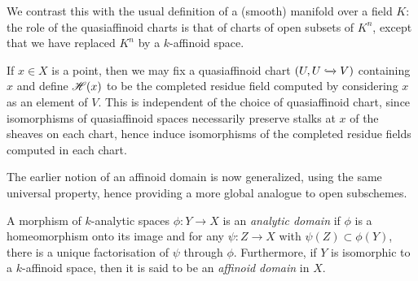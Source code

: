 We contrast this with the usual definition of a (smooth) manifold over a field $K$: the role of the quasiaffinoid charts is that of charts of open subsets of $K^n$, except that we have replaced $K^n$ by a $k$-affinoid space.

If $x \in X$ is a point, then we may fix a quasiaffinoid chart $(U, U \xhookrightarrow{} V)$ containing $x$ and define $\mathscr{H}(x)$ to be the completed residue field computed by considering $x$ as an element of $V$.
This is independent of the choice of quasiaffinoid chart, since isomorphisms of quasiaffinoid spaces necessarily preserve stalks at $x$ of the sheaves on each chart, hence induce isomorphisms of the completed residue fields computed in each chart.

The earlier notion of an affinoid domain is now generalized, using the same universal property, hence providing a more global analogue to open subschemes.

\begin{defn} \label{analyticdomain} \parencite[\S 3.1]{berk1}
    A morphism of $k$-analytic spaces $\phi: Y \to X$ is an \textit{analytic domain} if $\phi$ is a homeomorphism onto its image and for any $\psi: Z \to X$ with $\psi(Z) \subset \phi(Y)$, there is a unique factorisation of $\psi$ through $\phi$. Furthermore, if $Y$ is isomorphic to a $k$-affinoid space, then it is said to be an \textit{affinoid domain} in $X$.
\end{defn}

